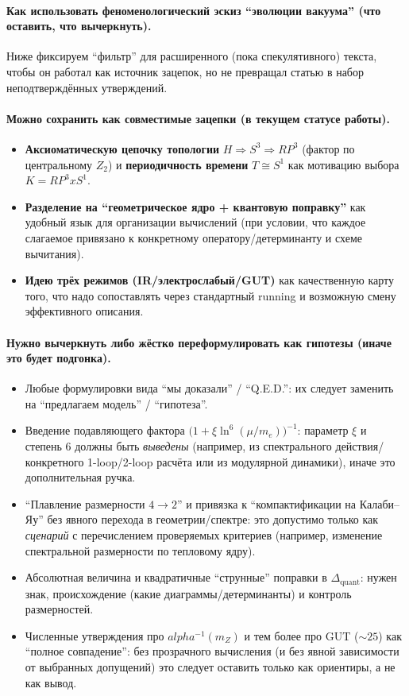 \documentclass[12pt]{article}
\def\mathbb#1{#1}%
\def\alpha{alpha}%
\def\times{x}%
\begin{document}
\paragraph{Как использовать феноменологический эскиз ``эволюции вакуума'' (что оставить, что вычеркнуть).}
Ниже фиксируем ``фильтр'' для расширенного (пока спекулятивного) текста, чтобы он работал как источник зацепок, но не превращал статью в набор неподтверждённых утверждений.

\paragraph{Можно сохранить как совместимые зацепки (в текущем статусе работы).}
\begin{itemize}
  \item \textbf{Аксиоматическую цепочку топологии} $\mathbb{H}\Rightarrow S^3\Rightarrow \mathbb{RP}^3$ (фактор по центральному $\mathbb{Z}_2$) и \textbf{периодичность времени} $T\cong S^1$ как мотивацию выбора $K=\mathbb{RP}^3\times S^1$.
  \item \textbf{Разделение на ``геометрическое ядро + квантовую поправку''} как удобный язык для организации вычислений (при условии, что каждое слагаемое привязано к конкретному оператору/детерминанту и схеме вычитания).
  \item \textbf{Идею трёх режимов (IR/электрослабый/GUT)} как качественную карту того, что надо сопоставлять через стандартный running и возможную смену эффективного описания.
\end{itemize}

\paragraph{Нужно вычеркнуть либо жёстко переформулировать как гипотезы (иначе это будет подгонка).}
\begin{itemize}
  \item Любые формулировки вида ``мы доказали'' / ``Q.E.D.'': их следует заменить на ``предлагаем модель'' / ``гипотеза''.
  \item Введение подавляющего фактора $\bigl(1+\xi\ln^6(\mu/m_e)\bigr)^{-1}$: параметр $\xi$ и степень 6 должны быть \emph{выведены} (например, из спектрального действия/конкретного 1-loop/2-loop расчёта или из модулярной динамики), иначе это дополнительная ручка.
  \item ``Плавление размерности $4\to 2$'' и привязка к ``компактификации на Калаби--Яу'' без явного перехода в геометрии/спектре: это допустимо только как \emph{сценарий} с перечислением проверяемых критериев (например, изменение спектральной размерности по тепловому ядру).
  \item Абсолютная величина и квадратичные ``струнные'' поправки в $\Delta_{\mathrm{quant}}$: нужен знак, происхождение (какие диаграммы/детерминанты) и контроль размерностей.
  \item Численные утверждения про $\alpha^{-1}(m_Z)$ и тем более про GUT ($\sim 25$) как ``полное совпадение'': без прозрачного вычисления (и без явной зависимости от выбранных допущений) это следует оставить только как ориентиры, а не как вывод.
\end{itemize}
\end{document}
